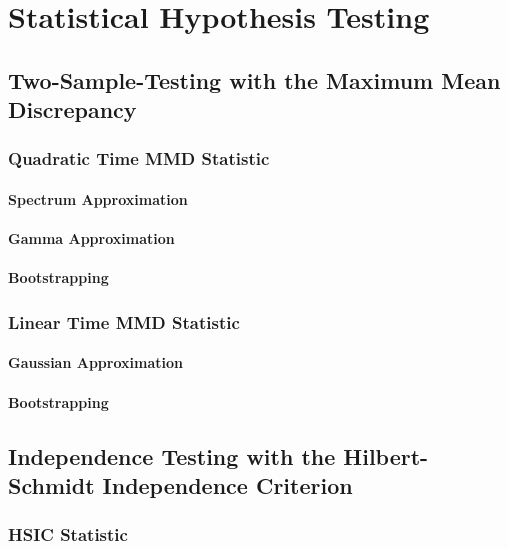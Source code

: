 %

\chapter{Statistical Hypothesis Testing}

\section{Two-Sample-Testing with the Maximum Mean Discrepancy}

\subsection{Quadratic Time MMD Statistic}

\subsubsection{Spectrum Approximation}
\subsubsection{Gamma Approximation}
\subsubsection{Bootstrapping}

\subsection{Linear Time MMD Statistic}
\subsubsection{Gaussian Approximation}
\subsubsection{Bootstrapping}

\section{Independence Testing with the Hilbert-Schmidt Independence Criterion}

\subsection{HSIC Statistic}